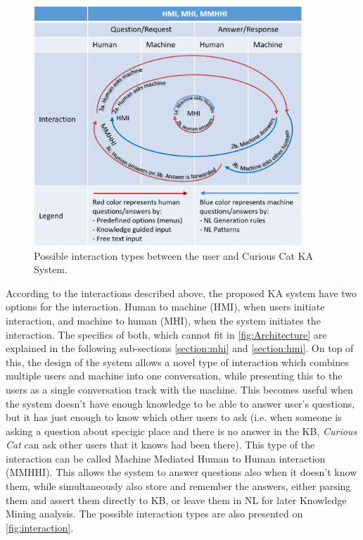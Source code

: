 \begin{figure}[htb]
	\centering
		\includegraphics[width=0.9\textwidth]{figures/interactionLoop.png}
	\caption{Possible interaction types between the user and Curious Cat KA
			 System.}
	\label{fig:interaction}
\end{figure}

According to the interactions described above, the proposed KA system have two 
options for the interaction. Human to machine (HMI), when users initiate 
interaction, and machine to human (MHI), when the system initiates the 
interaction. The specifics of both, which cannot fit in 
\autoref{fig:Architecture} are explained in the following sub-sections 
\ref{section:mhi} and \ref{section:hmi}. On top of this, the design of the 
system allows a novel 
type of interaction which combines multiple users and machine into one 
conversation, while presenting this to the users as a single conversation track
with the machine. This becomes useful when the system doesn't have enough
knowledge to be able to answer user's questions, but it has just enough to know
which other users to ask (i.e. when someone is asking a question about specigic
place and there is no answer in the KB, \emph{Curious Cat} can ask other users
that it knows had been there). This type of the interaction can be called
Machine Mediated Human to Human interaction (MMHHI). This allows the system
to answer questions also when it doesn't know them, while simultaneously also
store and remember the answers, either parsing them and assert them directly to 
KB, or leave them in NL for later Knowledge Mining analysis. The possible
interaction types are also presented on \autoref{fig:interaction}.

